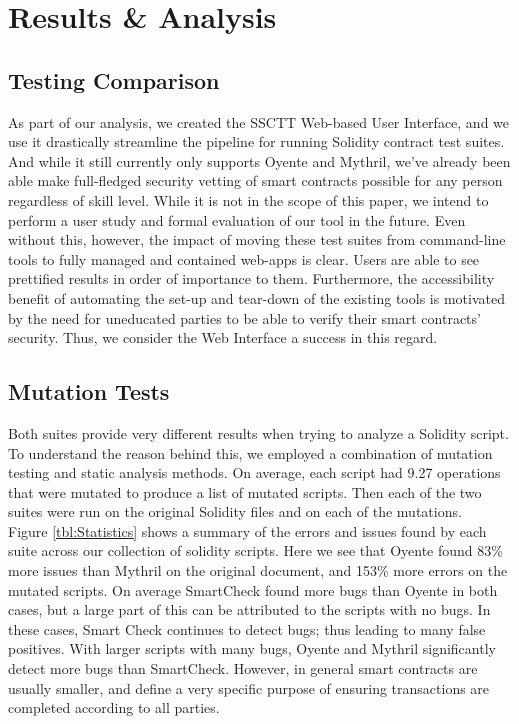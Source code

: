
\section{Results \& Analysis}
\subsection{Testing Comparison}

As part of our analysis, we created the SSCTT Web-based User Interface, and we use it drastically streamline the pipeline for running Solidity contract test suites. And while it still currently only supports Oyente and Mythril, we've already been able make full-fledged security vetting of smart contracts possible for any person regardless of skill level. While it is not in the scope of this paper, we intend to perform a user study and formal evaluation of our tool in the future. Even without this, however, the impact of moving these test suites from command-line tools to fully managed and contained web-apps is clear. Users are able to see prettified results in order of importance to them. Furthermore, the accessibility benefit of automating the set-up and tear-down of the existing tools is motivated by the need for uneducated parties to be able to verify their smart contracts' security. Thus, we consider the Web Interface a success in this regard. \\

\subsection{Mutation Tests}

Both suites provide very different results when trying to analyze a Solidity script. To understand the reason behind this, we employed a combination of mutation testing and static analysis methods. On average, each script had 9.27 operations that were mutated to produce a list of mutated scripts. Then each of the two suites were run on the original Solidity files and on each of the mutations. \\

Figure \ref{tbl:Statistics} shows a summary of the errors and issues found by each suite across our collection of solidity scripts. Here we see that Oyente found 83\% more issues than Mythril on the original document, and 153\% more errors on the mutated scripts. On average SmartCheck found more bugs than Oyente in both cases, but a large part of this can be attributed to the scripts with no bugs. In these cases, Smart Check continues to detect bugs; thus leading to many false positives. With larger scripts with many bugs, Oyente and Mythril significantly detect more bugs than SmartCheck. However, in general smart contracts are usually smaller, and define a very specific purpose of ensuring transactions are completed according to all parties. \\


